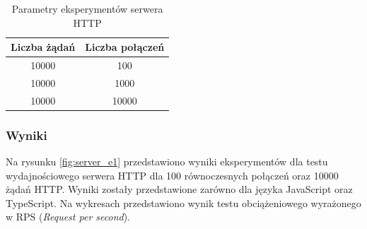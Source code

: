 \begin{table}[H]
  \centering
  \caption{Parametry eksperymentów serwera HTTP}
  \begin{tabular}{|c|c|}
    \hline
    \textbf{Liczba żądań} & \textbf{Liczba połączeń}\\ \hline
    10000 & 100 \\ \hline
    10000 & 1000 \\ \hline
    10000 & 10000 \\ \hline
  \end{tabular}
  \label{tab:http_experiments}
\end{table}

\subsubsection{Wyniki}
Na rysunku \ref{fig:server_e1} przedstawiono wyniki eksperymentów dla testu wydajnościowego serwera HTTP dla 100 równoczesnych połączeń oraz 10000 żądań HTTP. Wyniki zostały przedstawione zarówno dla języka JavaScript oraz TypeScript. Na wykresach przedstawiono wynik testu obciążeniowego wyrażonego w RPS (\textit{Request per second}).

